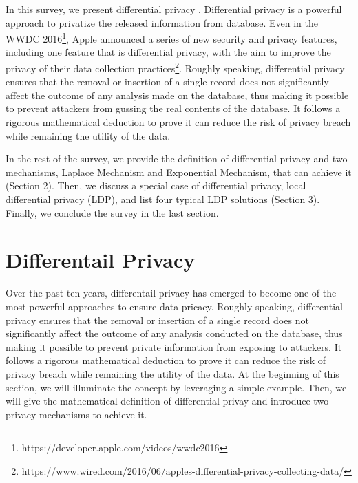 \documentclass[a4paper, 11pt]{article} %
\theoremstyle{definition}
\begin{document}
In this survey, we present differential privacy\cite{dwork2008differential, dwork2014algorithmic} . Differential privacy is a powerful approach to privatize the released information from database. Even in the WWDC 2016\footnote{https://developer.apple.com/videos/wwdc2016}, Apple announced a series of new security and privacy features, including one feature that is differential privacy, with the aim to improve the privacy of their data collection practices\footnote{https://www.wired.com/2016/06/apples-differential-privacy-collecting-data/}. Roughly speaking, differential privacy ensures that the removal or insertion of a single record does not significantly affect the outcome of any analysis made on the database, thus making it possible to prevent attackers from gussing the real contents of the database. It follows a rigorous mathematical deduction to prove it can reduce the risk of privacy breach while remaining the utility of the data.

In the rest of the survey, we provide the definition of differential privacy and two mechanisms, Laplace Mechanism and Exponential Mechanism, that can achieve it (Section 2). Then, we discuss a special case of differential privacy, local differential privacy (LDP), and list four typical LDP solutions (Section 3). Finally, we conclude the survey in the last section.    



\section{Differentail Privacy}

Over the past ten years, differentail privacy\cite{dwork2008differential, dwork2014algorithmic} has emerged to become one of the most powerful approaches to ensure data pricacy. Roughly speaking, differential privacy ensures that the removal or insertion of a single record does not significantly affect the outcome of any analysis conducted on the database, thus making it possible to prevent private information from exposing to attackers. It follows a rigorous mathematical deduction to prove it can reduce the risk of privacy breach while remaining the utility of the data. At the beginning of this section, we will illuminate the concept by leveraging a simple example. Then, we will give the mathematical definition of differential privay and introduce two privacy mechanisms to achieve it.
\end{document}
